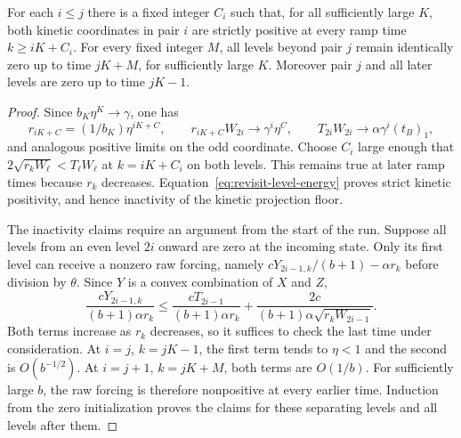 \begin{lemma}
\label{lem:revisit-activation-separation}
For each $i\leq j$ there is a fixed integer $C_i$ such that, for all
sufficiently large $K$, both kinetic coordinates in pair $i$ are strictly
positive at every ramp time $k\geq iK+C_i$.
For every fixed integer $M$, all levels beyond pair $j$ remain identically
zero up to time $jK+M$, for sufficiently large $K$.
Moreover pair $j$ and all later levels are zero up to time $jK-1$.
\end{lemma}
\begin{proof}
Since $b_K\eta^K\to\gamma$, one has
\[
 r_{iK+C}=(1/b_K)\eta^{iK+C},\qquad
 r_{iK+C}W_{2i}\longrightarrow\gamma^i\eta^C,
 \qquad T_{2i}W_{2i}\longrightarrow\alpha\gamma^i(t_B)_1,
\]
and analogous positive limits on the odd coordinate. Choose $C_i$ large
enough that $2\sqrt{r_kW_\ell}<T_\ell W_\ell$ at $k=iK+C_i$
on both levels. This remains true at later ramp times because $r_k$
decreases. Equation~\eqref{eq:revisit-level-energy} proves strict
kinetic positivity, and hence inactivity of the kinetic projection floor.

The inactivity claims require an argument from the start of the run.
Suppose all levels from an even level $2i$ onward are zero at the incoming
state. Only its first level can receive a nonzero raw forcing, namely
$cY_{2i-1,k}/(b+1)-\alpha r_k$ before division by $\theta$.
Since $Y$ is a convex combination of $X$ and $Z$,
\[
 \frac{cY_{2i-1,k}}{(b+1)\alpha r_k}
 \leq\frac{cT_{2i-1}}{(b+1)\alpha r_k}
   +\frac{2c}{(b+1)\alpha\sqrt{r_kW_{2i-1}}}.
\]
Both terms increase as $r_k$ decreases, so it suffices to check the last
time under consideration. At $i=j$, $k=jK-1$, the first term tends to
$\eta<1$ and the second is $O(b^{-1/2})$.
At $i=j+1$, $k=jK+M$, both terms are $O(1/b)$.
For sufficiently large $b$, the raw forcing is therefore nonpositive
at every earlier time. Induction from the zero initialization proves
the claims for these separating levels and all levels after them.
\end{proof}

